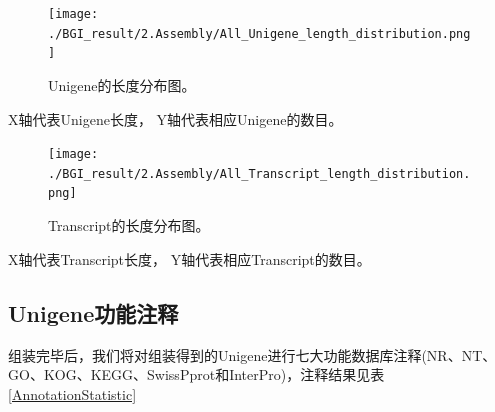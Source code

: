 \documentclass[10pt, oneside,a4paper]{article}
\begin{document}
\begin{figure}[H]
\centering
\texttt{[image: ./BGI\_result/2.Assembly/All\_Unigene\_length\_distribution.png]}
\par
\renewcommand{\figurename}{图}
\caption{Unigene的长度分布图。 }
\label{UnigeneLength}
\end{figure}
\begin{center}
X轴代表Unigene长度， Y轴代表相应Unigene的数目。
\end{center}
\par
\vspace{5 mm}

\begin{figure}[H]
\centering
\texttt{[image: ./BGI\_result/2.Assembly/All\_Transcript\_length\_distribution.png]}
\par
\renewcommand{\figurename}{图}
\caption{Transcript的长度分布图。}
\label{TransLength}
\end{figure}

\begin{center}
X轴代表Transcript长度， Y轴代表相应Transcript的数目。
\end{center}
\vspace{5 mm}

\subsection{Unigene功能注释}
组装完毕后，我们将对组装得到的Unigene进行七大功能数据库注释(NR、NT、GO、KOG、KEGG、SwissPprot和InterPro)，注释结果见表\ref{AnnotationStatistic}
\begin{table}[H]
\centering
{}
\end{table}
\end{document}
